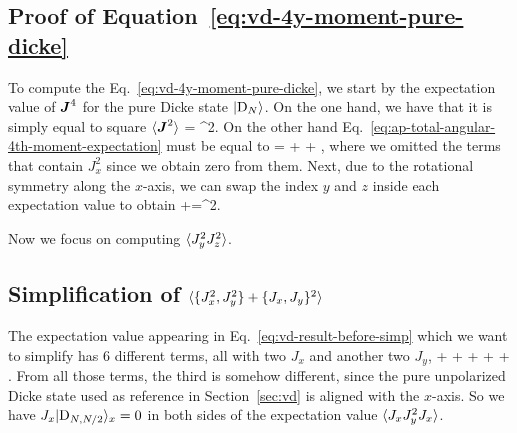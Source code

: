 \subsection {Proof of Equation~\eqref{eq:vd-4y-moment-pure-dicke}}
\label{app:proof-of-4th-y-moment-pure-dicke}

To compute the Eq.~\eqref{eq:vd-4y-moment-pure-dicke}, we start by the expectation value of $\boldsymbol{J}^4$ for the pure Dicke state $\vert{\ensuremath{\textnormal{D}_{N}}}\rangle$.
On the one hand, we have that it is simply equal to square $\langle{\ensuremath{\boldsymbol{J}}^2}\rangle$
\be
   = \lpar{}\rpar^2.
  \label{eq:ap-total-angular-4th-moment-expectation}
\ee
On the other hand Eq.~\eqref{eq:ap-total-angular-4th-moment-expectation} must be equal to
\be
   =  +  + ,
\ee
where we omitted the terms that contain $J_x^2$ since we obtain zero from them.
Next, due to the rotational symmetry along the $x$-axis, we can swap the index $y$ and $z$ inside each expectation value to obtain
\be
  +=\lpar{}\rpar^2.
\ee

Now we focus on computing $\langle{J_y^2J_z^2}\rangle$.


\subsection[Simplification of the Equation~\eqref{eq:vd-result-before-simp}]
{Simplification of $\langle{\{J_x^2,J_y^2\}+\{J_x,J_y\}^2}\rangle$}
\label{app:simplification-of-4th-moments}

The expectation value appearing in Eq.~\eqref{eq:vd-result-before-simp} which we want to simplify has 6 different terms, all with two $J_x$ and another two $J_y$,
\be
   +  + 
  +  +  + .
\ee
From all those terms, the third is somehow different, since the pure unpolarized Dicke state used as reference in Section~\ref{sec:vd} is aligned with the $x$-axis.
So we have $J_x\vert{\ensuremath{\textnormal{D}_{N,N/2}}}\rangle_x=0$ in both sides of the expectation value $\langle{J_xJ_y^2J_x}\rangle$.

